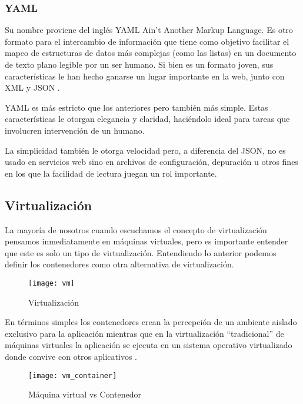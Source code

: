 \subsubsection{YAML}

Su nombre proviene del inglés YAML Ain’t Another Markup Language. Es otro formato para el intercambio de información que tiene como objetivo facilitar el mapeo de estructuras de datos más complejas (como las listas) en un documento de texto plano legible por un ser humano. Si bien es un formato joven, sus características le han hecho ganarse un lugar importante en la web, junto con XML y JSON \cite{formato3}.

YAML es más estricto que los anteriores pero también más simple. Estas características le otorgan elegancia y claridad, haciéndolo ideal para tareas que involucren intervención de un humano.

La simplicidad también le otorga velocidad pero, a diferencia del JSON, no es usado en servicios web sino en archivos de configuración, depuración u otros fines en los que la facilidad de lectura juegan un rol importante.

\subsection{Virtualización}

La mayoría de nosotros cuando escuchamos el concepto de virtualización pensamos inmediatamente en máquinas virtuales, pero es importante entender que este es solo un tipo de virtualización. Entendiendo lo anterior podemos definir los contenedores como otra alternativa de virtualización.

\begin{figure}[htp!]
  \centering
  \texttt{[image: vm]}
  \caption{Virtualización}
  \label{fig:vm}
\end{figure}

En términos simples los contenedores crean la percepción de un ambiente aislado exclusivo para la aplicación mientras que en la virtualización “tradicional” de máquinas virtuales la aplicación se ejecuta en un sistema operativo virtualizado donde convive con otros aplicativos \cite{docker1}.

\begin{figure}[htp!]
  \centering
  \texttt{[image: vm\_container]}
  \caption{Máquina virtual vs Contenedor}
  \label{fig:vm_container}
\end{figure}

